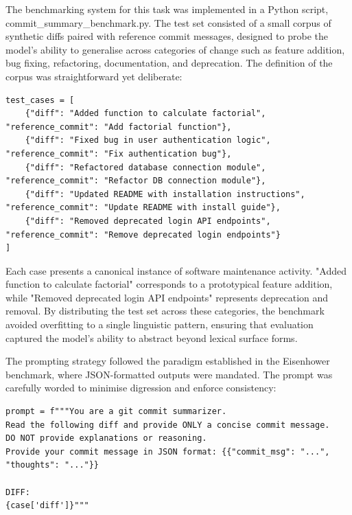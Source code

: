 \documentclass{report}
\begin{document}
The benchmarking system for this task was implemented in a Python script, commit\_summary\_benchmark.py. 
The test set consisted of a small corpus of synthetic diffs paired with reference commit messages, designed to probe the model's ability to generalise across categories of change such as feature addition, bug fixing, refactoring, documentation, and deprecation. 
The definition of the corpus was straightforward yet deliberate:

\begin{lstlisting}[style=pythonstyle]
test_cases = [
    {"diff": "Added function to calculate factorial", "reference_commit": "Add factorial function"},
    {"diff": "Fixed bug in user authentication logic", "reference_commit": "Fix authentication bug"},
    {"diff": "Refactored database connection module", "reference_commit": "Refactor DB connection module"},
    {"diff": "Updated README with installation instructions", "reference_commit": "Update README with install guide"},
    {"diff": "Removed deprecated login API endpoints", "reference_commit": "Remove deprecated login endpoints"}
]

\end{lstlisting}

Each case presents a canonical instance of software maintenance activity. 
"Added function to calculate factorial" corresponds to a prototypical feature addition, while "Removed deprecated login API endpoints" represents deprecation and removal. 
By distributing the test set across these categories, the benchmark avoided overfitting to a single linguistic pattern, ensuring that evaluation captured the model's ability to abstract beyond lexical surface forms.

The prompting strategy followed the paradigm established in the Eisenhower benchmark, where JSON-formatted outputs were mandated. 
The prompt was carefully worded to minimise digression and enforce consistency:

\begin{lstlisting}[style=pythonstyle]
    prompt = f"""You are a git commit summarizer.
Read the following diff and provide ONLY a concise commit message.
DO NOT provide explanations or reasoning.
Provide your commit message in JSON format: {{"commit_msg": "...", "thoughts": "..."}}

DIFF:
{case['diff']}"""

\end{lstlisting}
\end{document}
